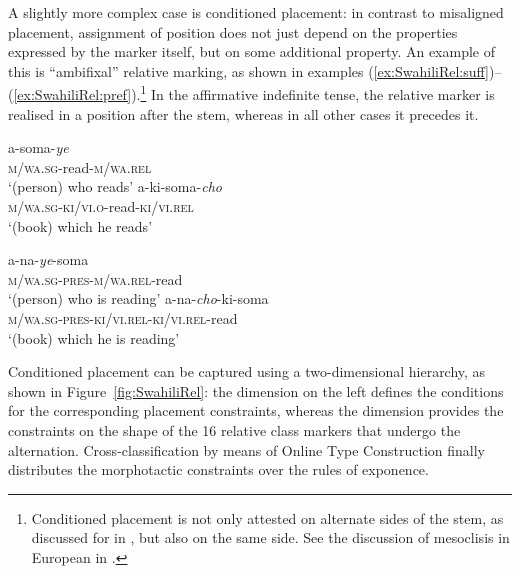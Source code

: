 \documentclass[output=paper
	        ,collection
	        ,collectionchapter
 	        ,biblatex
                ,babelshorthands
                ,newtxmath
                ,draftmode
                ,colorlinks, citecolor=brown
]{langscibook}
\begin{document}
\begin{exe}
\begin{xlist}
\begin{exe}
\begin{xlist}
A slightly more complex case is conditioned placement: in contrast to
misaligned placement, assignment of position does not just depend on
the properties expressed by the marker itself, but on some additional
property. An example of this is  ``ambifixal'' relative
marking, as shown in examples
(\ref{ex:SwahiliRel:suff})--(\ref{ex:SwahiliRel:pref}).\footnote{Conditioned
  placement is not only attested on alternate sides of the stem, as
  discussed for  in \citet{Stump93}, but also on the same
  side. See the discussion of mesoclisis in European  in
  \citet{Crysmann:Bonami:2016}.} In the affirmative indefinite tense,
the relative marker is realised in a position after the stem, whereas
in all other cases it precedes it. 

\begin{exe}
  \ex\label{ex:SwahiliRel:suff}
  \begin{xlist}
    \ex\gll  a-soma-\textit{ye}\\
    \textsc{m/wa.sg}-read\textsc{-m/wa.rel}\\
    \glt ‘(person) who reads’
    \ex\gll a-ki-soma-\textit{cho}\\
    \textsc{m/wa.sg}-\textsc{ki/vi.o}-read-\textsc{ki/vi.rel}\\
    \glt ‘(book) which he reads’
  \end{xlist}
  \ex\label{ex:SwahiliRel:pref}
  \begin{xlist}
    \ex\gll  a-na-\textit{ye}-soma\\
    \textsc{m/wa.sg-pres-m/wa.rel}-read\\
    \glt ‘(person) who is reading’
    \ex\gll a-na-\textit{cho}-ki-soma\\
    \textsc{m/wa.sg-pres-ki/vi.rel-ki/vi.rel}-read\\
    \glt ‘(book) which he is reading’
  \end{xlist}
\end{exe}

Conditioned placement can be captured using a two-dimensional
hierarchy, as shown in Figure~\ref{fig:SwahiliRel}: the
 dimension on the left defines the conditions for
the corresponding placement constraints, whereas the 
dimension provides the constraints on the shape of the 16 relative
class markers that undergo the alternation.  Cross-classification by
means of Online Type Construction finally distributes the morphotactic
constraints over the rules of exponence.
  


\end{xlist}
\end{exe}
\end{xlist}
\end{exe}
\end{document}
